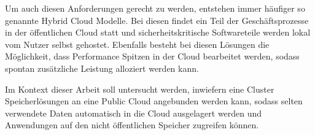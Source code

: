 Um auch diesen Anforderungen gerecht zu werden, entstehen immer häufiger so genannte Hybrid Cloud Modelle. Bei diesen findet ein Teil der Geschäftsprozesse in der öffentlichen Cloud statt und sicherheitskritische Softwareteile werden lokal vom Nutzer selbst gehostet. Ebenfalls besteht bei diesen Lösungen die Möglichkeit, dass Performance Spitzen in der Cloud bearbeitet werden, sodass spontan zusätzliche Leistung alloziert werden kann.

Im Kontext dieser Arbeit soll untersucht werden, inwiefern eine Cluster Speicherlösungen an eine Public Cloud angebunden werden kann, sodass selten verwendete Daten automatisch in die Cloud ausgelagert werden und Anwendungen auf den nicht öffentlichen Speicher zugreifen können.  